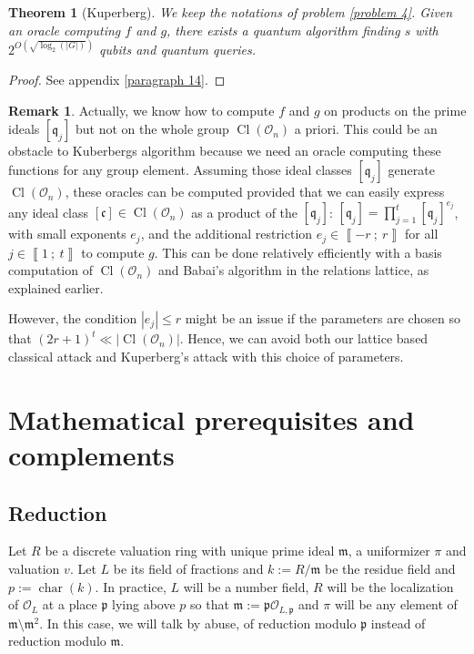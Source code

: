 \documentclass[a4paper,10pt]{report}
\theoremstyle{definition}
\theoremstyle{plain}
\newtheorem{theorem}[definition]{Theorem}
\theoremstyle{definition}
\newtheorem{remark}[definition]{Remark}
\newcommand{\mO}{\mathcal{O}}
\renewcommand{\i}[2]{\left\llbracket #1~;~#2\right\rrbracket}
\renewcommand{\(}{\left(}
\renewcommand{\)}{\right)}
\newcommand{\mf}[1]{\mathfrak{#1}}
\newcommand{\mfm}{\mathfrak{m}}
\newcommand{\mfp}{\mathfrak{p}}
\DeclareMathOperator{\Cl}{Cl}
\DeclareMathOperator{\Char}{char}%
\begin{document}
\begin{theorem}[Kuperberg]
We keep the notations of problem \ref{problem 4}. Given an oracle computing $f$ and $g$, there exists a quantum algorithm finding $s$ with $2^{O(\sqrt{\log_2(|G|)})}$ qubits and quantum queries.
\end{theorem}

\begin{proof}
See appendix \ref{paragraph 14}.
\end{proof}

\begin{remark}
Actually, we know how to compute $f$ and $g$ on products on the prime ideals $[\mf{q}_j]$ but not on the whole group $\Cl(\mO_n)$ a priori. This could be an obstacle to Kuberbergs algorithm because we need an oracle computing these functions for any group element. Assuming those ideal classes $[\mf{q}_j]$ generate $\Cl(\mO_n)$, these oracles can be computed provided that we can easily express any ideal class $[\mf{c}]\in \Cl(\mO_n)$ as a product of the $[\mf{q}_j]$: $[\mf{q}_j]=\prod_{j=1}^t[\mf{q}_j]^{e_j}$, with small exponents $e_j$, and the additional restriction $e_j\in\i{-r}{r}$ for all $j\in\i{1}{t}$ to compute $g$. This can be done relatively efficiently with a basis computation of $\Cl(\mO_n)$ and Babai's algorithm in the relations lattice, as explained earlier.  

However, the condition $|e_j|\leq r$ might be an issue if the parameters are chosen so that $(2r+1)^t\ll |\Cl(\mO_n)|$. Hence, we can avoid both our lattice based classical attack and Kuperberg's attack with this choice of parameters.
\end{remark}






\appendix

\chapter{Mathematical prerequisites and complements}

\section{Reduction}

Let $R$ be a discrete valuation ring with unique prime ideal $\mf{m}$,  a uniformizer $\pi$ and valuation $v$.  Let $L$ be its field of fractions and $k:=R/\mfm$ be the residue field and $p:=\Char(k)$.  In practice,  $L$ will be a number field, $R$ will be the localization of $\mO_L$ at a place $\mfp$ lying above $p$ so that $\mfm:=\mfp\mO_{L,\mfp}$ and $\pi$ will be any element of $\mfm\setminus\mfm^2$.  In this case, we will talk by abuse, of reduction modulo $\mfp$ instead of reduction modulo $\mfm$. 
\end{document}
